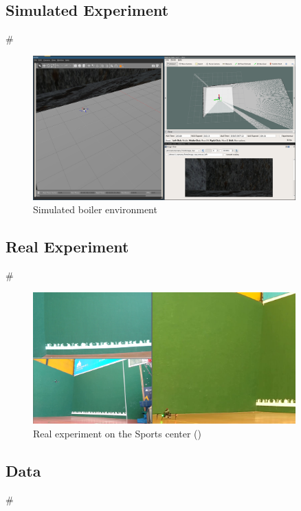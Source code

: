 \documentclass[]{beamer}
\newcommand{\mSlideTitle}{{{\color{gray}\secname}} \# \subsecname}
\begin{document}
\subsection{Simulated Experiment}
\begin{frame}{\mSlideTitle}
  \begin{figure}
    \centering
    \includegraphics[width=0.9\textwidth]{FullSim.png}
    \caption{Simulated boiler environment}
  \end{figure}
\end{frame}

\subsection{Real Experiment}
\begin{frame}{\mSlideTitle}
  \begin{figure}
    \centering
    \includegraphics[width=0.9\textwidth]{RealFlight.png}
    \caption{Real experiment on the Sports center (\href{run:real_flight.mp4}{\color{blue}{video}})}
  \end{figure}
\end{frame}

\subsection{Data}
\begin{frame}{\mSlideTitle}
  
\end{frame}
\end{document}
